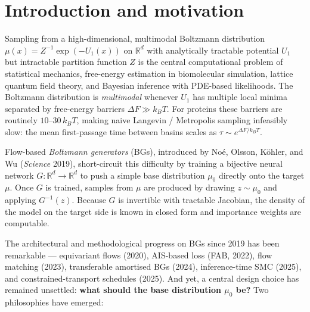 \documentclass[11pt,letterpaper]{article}
\newcommand{\Real}{\mathbb{R}}
\theoremstyle{plain}
\begin{document}
\bigskip

\setcounter{tocdepth}{2}
\tableofcontents

\section{Introduction and motivation}

Sampling from a high-dimensional, multimodal Boltzmann distribution
$\mu(x)=Z^{-1}\exp(-U_1(x))$ on $\Real^d$ with analytically tractable potential
$U_1$ but intractable partition function $Z$ is the central computational problem
of statistical mechanics, free-energy estimation in biomolecular simulation, lattice
quantum field theory, and Bayesian inference with PDE-based likelihoods. The
Boltzmann distribution is \emph{multimodal} whenever $U_1$ has multiple local minima
separated by free-energy barriers $\Delta F \gg k_B T$. For proteins these barriers
are routinely $10$--$30\,k_BT$, making naive Langevin / Metropolis sampling
infeasibly slow: the mean first-passage time between basins scales as
$\tau\sim e^{\Delta F/k_BT}$.

Flow-based \emph{Boltzmann generators} (BGs), introduced by Noé, Olsson, Köhler, and
Wu (\emph{Science} 2019), short-circuit this difficulty by training a bijective
neural network $G:\Real^d\to\Real^d$ to push a simple base distribution $\mu_0$
directly onto the target $\mu$. Once $G$ is trained, samples from $\mu$ are produced
by drawing $z\sim\mu_0$ and applying $G^{-1}(z)$. Because $G$ is invertible with
tractable Jacobian, the density of the model on the target side is known in closed
form and importance weights are computable.

The architectural and methodological progress on BGs since 2019 has been remarkable
--- equivariant flows (2020), AIS-based loss (FAB, 2022), flow matching (2023),
transferable amortised BGs (2024), inference-time SMC (2025), and constrained-transport
schedules (2025). And yet, a central design choice has remained unsettled:
\textbf{what should the base distribution $\mu_0$ be?} Two philosophies have emerged:
\end{document}
